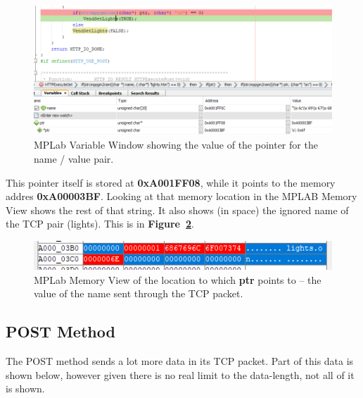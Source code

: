 \documentclass[a4paper, 12pt]{article}
\begin{document}
\begin{figure}[H]
\centering
\includegraphics[width=\textwidth]{img-get-variable.PNG}
\caption{MPLab Variable Window showing the value of the pointer for the name / value pair.}
\label{fig:img-get-variable}
\end{figure}

This pointer itself is stored at \textbf{0xA001FF08}, while it points to the memory addres \textbf{0xA00003BF}. Looking at that memory location in the MPLAB Memory View shows the rest of that string. It also shows (in space) the ignored name of the TCP pair (lights). This is in \textbf{Figure~\ref{fig:img-get-memory}}.

\begin{figure}[H]
\centering
\includegraphics[width=\textwidth]{img-get-memory.PNG}
\caption{MPLab Memory View of the location to which \textbf{ptr} points to -- the value of the name sent through the TCP packet.}
\label{fig:img-get-memory}
\end{figure}

\subsection{POST Method}
\label{sec:post-method}
The POST method sends a lot more data in its TCP packet. Part of this data is shown below, however given there is no real limit to the data-length, not all of it is shown.
\end{document}
